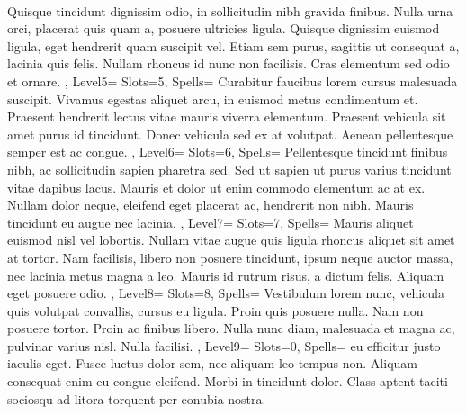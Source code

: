 \documentclass[10pt,a4paper]{scrbook}
\begin{document}
{{{				\\
				Quisque tincidunt dignissim odio, 
				in sollicitudin nibh gravida finibus. 
				Nulla urna orci, placerat quis quam a, 
				posuere ultricies ligula. 
				Quisque dignissim euismod ligula, 
				eget hendrerit quam suscipit vel. 
				Etiam sem purus, sagittis ut consequat a,
				lacinia quis felis. 
				Nullam rhoncus id nunc non facilisis. 
				Cras elementum sed odio et ornare. 
			}
		},
		Level5={
			Slots=5,
			Spells={
				Curabitur faucibus lorem cursus malesuada suscipit. 
				Vivamus egestas aliquet arcu, 
				in euismod metus condimentum et. 
				Praesent hendrerit lectus vitae mauris viverra elementum. 
				Praesent vehicula sit amet purus id tincidunt. 
				Donec vehicula sed ex at volutpat. 
				Aenean pellentesque semper est ac congue. 
			}
		},
		Level6={
			Slots=6,
			Spells={
				Pellentesque tincidunt finibus nibh, 
				ac sollicitudin sapien pharetra sed. 
				Sed ut sapien ut purus varius tincidunt vitae dapibus lacus. 
				Mauris et dolor ut enim commodo elementum ac at ex. 
				Nullam dolor neque, eleifend eget placerat ac, 
				hendrerit non nibh. 
				Mauris tincidunt eu augue nec lacinia. 
			}
		},
		Level7={
			Slots=7,
			Spells={
				Mauris aliquet euismod nisl vel lobortis. 
				Nullam vitae augue quis ligula rhoncus aliquet sit amet at tortor. 
				Nam facilisis, libero non posuere tincidunt, 
				ipsum neque auctor massa, nec lacinia metus magna a leo. 
				Mauris id rutrum risus, a dictum felis. 
				Aliquam eget posuere odio. 
			}
		},
		Level8={
			Slots=8,
			Spells={
				Vestibulum lorem nunc, vehicula quis volutpat convallis, 
				cursus eu ligula. Proin quis posuere nulla. 
				Nam non posuere tortor. 
				Proin ac finibus libero. 
				Nulla nunc diam, malesuada et magna ac, 
				pulvinar varius nisl. 
				Nulla facilisi. 
			}
		},
		Level9={
			Slots=0,
			Spells={
				eu efficitur justo iaculis eget. 
				Fusce luctus dolor sem, nec aliquam leo tempus non. 
				Aliquam consequat enim eu congue eleifend. 
				Morbi in tincidunt dolor. 
				Class aptent taciti sociosqu ad litora torquent 
				per conubia nostra. 
			}
		}
	}
\end{document}
